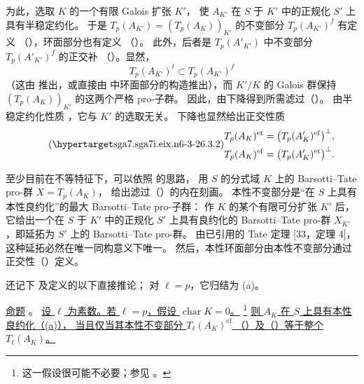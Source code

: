 为此，选取 $K$ 的一个有限 Galois 扩张 $K'$，
使 $A_{K'}$ 在 $S$ 于 $K'$ 中的正规化 $S'$ 上具有半稳定约化。
于是 $T_p(A_{K'})=(T_p(A_K))_{K'}$ 的不变部分 $T_p(A_{K'})^f$ 有定义
（），环面部分也有定义
（）。
此外，后者是 $T_p(A'_{K'})$ 中不变部分 $T_p(A'_{K'})^f$ 的正交补
（）。显然，
\[
 T_p(A_{K'})^t\subset T_p(A_{K'})^f
\]
（这由  推出，或直接由 
中环面部分的构造推出），而 $K'/K$ 的 Galois 群保持 $(T_p(A_K))_{K'}$ 的这两个严格 pro-子群。
因此，由下降得到所需滤过（）。
由半稳定约化性质 ，它与 $K'$ 的选取无关。
下降也显然给出正交性质
\begin{equation}\tag{\SGARefTarget{sga7.sga7i.eix.n6-3-2}{6.3.2}}
 \begin{split}
 T_p(A_K)^{\mathrm{et}}
   &=\bigl(T_p(A'_K)^{\mathrm{ef}}\bigr)^\perp,\\
 T_p(A_K)^{\mathrm{ef}}
   &=\bigl(T_p(A'_K)^{\mathrm{et}}\bigr)^\perp.
 \end{split}
\end{equation}

至少目前在不等特征下，可以依照  的思路，
用 $S$ 的分式域 $K$ 上的 Barsotti--Tate pro-群 $X=T_p(A_K)$，
给出滤过（）的内在刻画。
本性不变部分是“在 $S$ 上具有本性良约化”的最大 Barsotti--Tate pro-子群：
作 $K$ 的某个有限可分扩张 $K'$ 后，它给出一个在 $S$ 于 $K'$ 中的正规化 $S'$ 上具有良约化的
Barsotti--Tate pro-群 $X_{K'}$，即延拓为 $S'$ 上的 Barsotti--Tate pro-群。
由已引用的 Tate 定理 [33，定理 4]，这种延拓必然在唯一同构意义下唯一。
然后，本性环面部分由本性不变部分通过正交性（）定义。

还记下  及定义的以下直接推论；
对 $\ell=p$，它归结为 (a)。

\medskip
\noindent
\underline{命题} 。
\underline{设 $\ell$ 为素数。若 $\ell=p$，假设 $\operatorname{char}K=0$。}
\footnote{这一假设很可能不必要；参见 。}
\underline{则 $A_K$ 在 $S$ 上具有本性良约化（(a)），
当且仅当其本性不变部分 $T_\ell(A_K)^{\mathrm{ef}}$
（）及（）等于整个 $T_\ell(A_K)$。}

